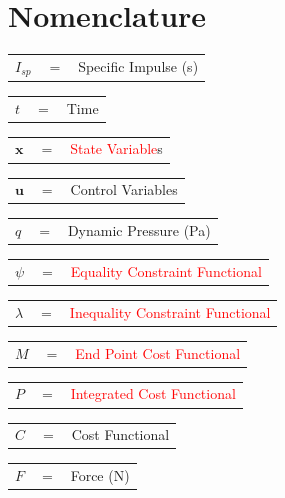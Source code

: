 \documentclass[journal]{new-aiaa}
\begin{document}
\section*{Nomenclature}
\noindent
\begin{tabular}{p{1.2cm}p{1cm}p{5cm}}
	 $I_{sp}$ & $=$ & Specific Impulse (s)\\ 
	\end{tabular} 
	  	\begin{tabular}{p{1.2cm}p{1cm}p{5cm}}
	  $t$ & $=$ & Time\\
	  	\end{tabular} 
	  	\begin{tabular}{p{1.2cm}p{1cm}p{5cm}}
	  $\textbf{x}$& $=$ & \textcolor{red}{State Variable}s\\
	  	\end{tabular} 
	  	\begin{tabular}{p{1.2cm}p{1cm}p{5cm}}
	  $\textbf{u}$& $=$ & Control Variables\\
	  	\end{tabular} 
	  	\begin{tabular}{p{1.2cm}p{1cm}p{5cm}}
	  $q$ & $=$ & Dynamic Pressure (Pa)\\
	  	\end{tabular} 
  		\begin{tabular}{p{1.2cm}p{1cm}p{5cm}}
  		$\psi$ & $=$ & \textcolor{red}{Equality Constraint Functional}\\
  	\end{tabular}
  	\begin{tabular}{p{1.2cm}p{1cm}p{5cm}}
  	$\lambda$ & $=$ & \textcolor{red}{Inequality Constraint Functional}\\
  \end{tabular}
	\begin{tabular}{p{1.2cm}p{1cm}p{5cm}}
	 $M$ & $=$ & \textcolor{red}{End Point Cost Functional}\\
\end{tabular}
	\begin{tabular}{p{1.2cm}p{1cm}p{5cm}}
	 $P$ & $=$ & \textcolor{red}{Integrated Cost Functional}\\
\end{tabular}
	  	\begin{tabular}{p{1.2cm}p{1cm}p{5cm}}
	  $C$ & $=$ & Cost Functional\\
	  	\end{tabular} 
	  	\begin{tabular}{p{1.2cm}p{1cm}p{5cm}}
	  $F$ & $=$ & Force (N)\\
	  	\end{tabular} 
\end{document}

